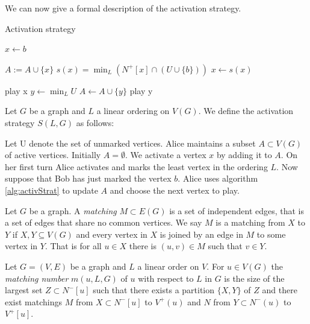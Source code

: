  We can now give a formal description of the activation strategy.

\begin{algorithm}[h]
    \caption{Activation strategy}
    \label{alg:activStrat}
    \begin{algorithmic}[1]
        \Statex
        \State $x \gets b$ 
        
        \State $A := A \cup \{x\}$
        \State $s(x) =\min_L(N^+[x] \cap (U \cup \{b\} ))$
        \State $x \gets s(x)$
        \EndWhile      
        
        \State play x
        \Else
        \State $y \gets \min_L U$
        \State $A \gets A \cup \{y\}$                    
        \EndIf     
        \State play y
        \EndIf   
    \end{algorithmic}
\end{algorithm}

\begin{definition} 
    Let $G$ be a graph and $L$ a linear ordering on $V(G)$. We define the activation strategy $S(L,G)$ as follows:
    
    Let U denote the set of unmarked vertices. Alice maintains a subset $A \subset V(G)$ of active vertices. Initially $A = \emptyset$. We activate a vertex $x$ by adding it to $A$. On her first turn Alice activates and marks the least vertex in the ordering $L$. Now suppose that Bob has just marked the vertex $b$. Alice uses algorithm \ref{alg:activStrat} to update $A$ and choose the next vertex to play.
\end{definition}

\begin{definition}[Matching]
    Let $G$ be a graph. A \textit{matching} $M\subset E(G)$ is a set of independent edges, that is a set of edges that share no common vertices. We say $M$ is a matching from $X$ to $Y$ if $X,Y\subseteq V(G)$ and every vertex in $X$ is joined by an edge in $M$ to some vertex in $Y$. That is for all $u\in X$ there is $(u,v)\in M$ such that $v\in Y$. 
\end{definition}

\begin{definition}
    Let $G=(V,E)$ be a graph and $L$ a linear order on $V$.    
    For $u \in V(G)$ the \textit{matching number} $m(u, L, G)$ of $u$ with respect to $L$ in $G$ is the size of the largest set $Z \subset N^-[u]$ such that there exists a partition $\{X, Y\}$ of $Z$ and there exist matchings $M$ from
    $X\subset N^-[u]$ to $V^+(u)$ and $N$ from $Y\subset N^-(u)$ to $V^+[u]$.    
\end{definition}

